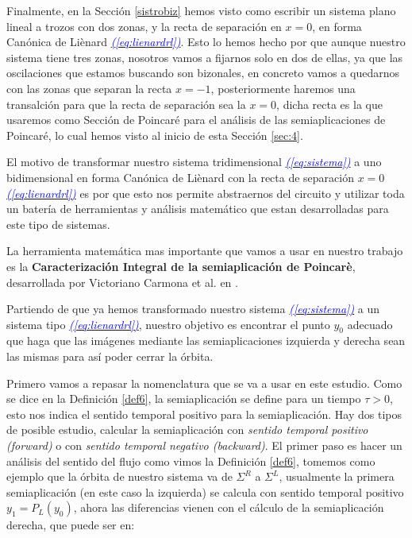 \documentclass[12pt,a4paper]{report} %
\newcommand{\eref}[1]{\hyperref[#1]{\textcolor{blue}{\textit{(\ref*{#1})}}}}
\begin{document}
	\vspace{0.5cm}\noindent Finalmente, en la Sección \ref{sistrobiz} hemos visto como escribir un sistema plano lineal a trozos con dos zonas, y la recta de separación en $x=0$, en forma Canónica de Liènard \eref{eq:lienardrl}. Esto lo hemos hecho por que aunque nuestro sistema tiene tres zonas, nosotros vamos a fijarnos solo en dos de ellas, ya que las oscilaciones que estamos buscando son bizonales, en concreto vamos a quedarnos con las zonas que separan la recta $x=-1$, posteriormente haremos una transalción para que la recta de separación sea la $x=0$, dicha recta es la que usaremos como Sección de Poincaré para el análisis de las semiaplicaciones de Poincaré, lo cual hemos visto al inicio de esta Sección \ref{sec:4}.
	
	\vspace{0.5cm}\noindent El motivo de transformar nuestro sistema tridimensional \eref{eq:sistema} a uno bidimensional en forma Canónica de Liènard con la recta de separación $x=0$ \eref{eq:lienardrl} es por que esto nos permite abstraernos del circuito y utilizar toda un batería de herramientas y análisis matemático que estan desarrolladas para este tipo de sistemas.
	
	\vspace{0.5cm}\noindent La herramienta matemática mas importante que vamos a usar en nuestro trabajo es la \textbf{Caracterización Integral de la semiaplicación de Poincarè}, desarrollada por Victoriano Carmona et al. en \cite{properties}.
	\newpage
	
	Partiendo de que ya hemos transformado nuestro sistema \eref{eq:sistema} a un sistema tipo \eref{eq:lienardrl}, nuestro objetivo es encontrar el punto $y_0$ adecuado que haga que las imágenes mediante las semiaplicaciones izquierda y derecha sean las mismas para así poder cerrar la órbita. 
	
	\vspace{0.5cm}\noindent Primero vamos a repasar la nomenclatura que se va a usar en este estudio. Como se dice en la Definición \ref{def6}, la semiaplicación se define para un tiempo $\tau>0$, esto nos indica el sentido temporal positivo para la semiaplicación. Hay dos tipos de posible estudio, calcular la semiaplicación con \textit{sentido temporal positivo (forward)} o con \textit{sentido temporal negativo (backward)}. El primer paso es hacer un análisis del sentido del flujo como vimos la Definición \ref{def6}, tomemos como ejemplo que la órbita de nuestro sistema va de $\varSigma^R$ a $\varSigma^L$, usualmente la primera semiaplicación (en este caso la izquierda) se calcula con sentido temporal positivo $y_1=P_L(y_0)$, ahora las diferencias vienen con el cálculo de la semiaplicación derecha, que puede ser en:
	
\end{document}

